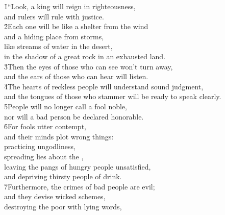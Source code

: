 \begin{poetry}
\poeml {}
\v{1}``Look, a king will reign in righteousness, \\
\poemll    and rulers will rule with justice. \\
\poeml \v{2}Each one will be like a shelter from the wind \\
\poemll    and a hiding place from storms, \\
\poeml like streams of water in the desert, \\
\poemll    in the shadow of a great rock in an exhausted land. \\
\poeml \v{3}Then the eyes of those who can see won't turn away, \\
\poemll    and the ears of those who can hear will listen. \\
\poeml \v{4}The hearts of reckless people will understand sound judgment, \\
\poemll    and the tongues of those who stammer will be ready to speak clearly. \\
\poeml \v{5}People will no longer call a fool noble, \\
\poemll    nor will a bad person be declared honorable. \\
\poeml \v{6}For fools utter contempt, \\
\poemll    and their minds plot wrong things: \\
\poeml practicing ungodliness, \\
\poemll    spreading lies about the , \\
\poeml leaving the pangs of hungry people unsatisfied, \\
\poemll    and depriving thirsty people of drink. \\
\poeml \v{7}Furthermore, the crimes of bad people are evil; \\
\poemll    and they devise wicked schemes, \\
\poeml destroying the poor with lying words, \\

\end{poetry}
